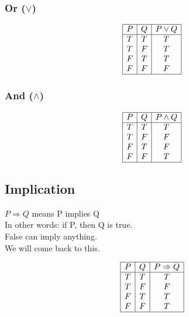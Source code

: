 \documentclass[a4paper]{article}
\begin{document}
\subsubsection{Or ($\lor$)}
\begin{center}
	\begin{displaymath}
		\begin{array}{|c|c|c|}
			\hline
			P & Q & P \lor Q \\ 
			\hline
			T & T & T\\
			T & F & T\\
			F & T & T\\
			F & F & F\\ 
			\hline
		\end{array}
	\end{displaymath}
\end{center}

\subsubsection{And ($\land$)}
\begin{center}
	\begin{displaymath}
		\begin{array}{|c|c|c|}
			\hline
			P & Q & P \land Q \\ 
			\hline
			T & T & T\\
			T & F & F\\
			F & T & F\\
			F & F & T\\ 
			\hline
		\end{array}
	\end{displaymath}
\end{center}

\subsection{Implication}
$P \Rightarrow Q$ means P implies Q 
\\
In other words: if P, then Q is true.
\\
False can imply anything.
\\
We will come back to this.
\begin{center}
	\begin{displaymath}
		\begin{array}{|c|c|c|}
			\hline
			P & Q & P \Rightarrow Q \\ 
			\hline
			T & T & T\\
			T & F & F\\
			F & T & T\\
			F & F & T\\
			\hline
		\end{array}
	\end{displaymath}
\end{center}
\end{document}
